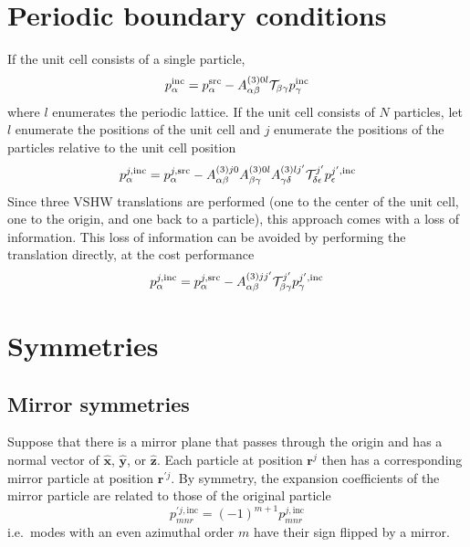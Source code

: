 \documentclass[11pt]{article}
\begin{document}
\section{Periodic boundary conditions}
If the unit cell consists of a single particle,
\begin{equation}
    p_{\alpha}^{\text{inc}} = 
    p_{\alpha}^{\text{src}} -
    A_{\alpha \beta}^{(3)0l}
    \mathcal{T}_{\beta \gamma}
    p_{\gamma}^{\text{inc}}
\end{equation}
where $l$ enumerates the periodic lattice.
If the unit cell consists of $N$ particles, let $l$ enumerate the positions of the unit cell and $j$ enumerate the positions of the particles relative to the unit cell position
\begin{equation}
    p_{\alpha}^{j,\text{inc}} = 
    p_{\alpha}^{j,\text{src}} -
    A_{\alpha \beta}^{(3)j 0}
    A_{\beta \gamma}^{(3)0l}
    A_{\gamma \delta}^{(3)l j^\prime}
    \mathcal{T}_{\delta \epsilon}^{j^\prime}
    p_{\epsilon}^{j^\prime,\text{inc}}
\end{equation}
Since three VSHW translations are performed (one to the center of the unit cell, one to the origin, and one back to a particle), this approach comes with a loss of information.
This loss of information can be avoided by performing the translation directly, at the cost performance
\begin{equation}
    p_{\alpha}^{j,\text{inc}} = 
    p_{\alpha}^{j,\text{src}} -
    A_{\alpha \beta}^{(3)j j^\prime}
    \mathcal{T}_{\beta \gamma}^{j^\prime}
    p_{\gamma}^{j^\prime,\text{inc}}
\end{equation}

\section{Symmetries}
\subsection{Mirror symmetries}
Suppose that there is a mirror plane that passes through the origin and has a normal vector of $\bm{\hat x}$, $\bm{\hat y}$, or $\bm{\hat z}$.
Each particle at position $\bm{r}^j$ then has a corresponding mirror particle at position $\bm{r}^{\prime j}$.
By symmetry, the expansion coefficients of the mirror particle are related to those of the original particle
\begin{equation}
    p^{\prime j,\text{inc}}_{mnr} = (-1)^{m+1} p^{j,\text{inc}}_{mnr}
    \label{eqn:mirror_symmetry}
\end{equation}
i.e.\ modes with an even azimuthal order $m$ have their sign flipped by a mirror.
\end{document}
